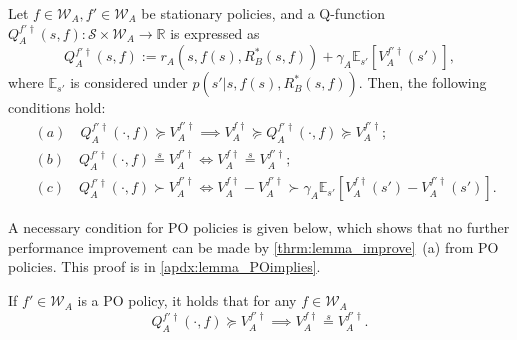 \documentclass{acml}
\providecommand{\R}{\mathbb{R}} %
\providecommand{\E}{\mathbb{E}} %
\providecommand{\x}{\times}
\providecommand{\eqs}{\stackrel{s}{=}}
\begin{document}
\begin{theorem}\label{thrm:lemma_improve}
	Let $f\in\mathcal{W}_A,f'\in\mathcal{W}_A$ be stationary policies, and a Q-function $Q_A^{f'\dag}(s,f): \mathcal{S}\x\mathcal{W}_A\to\R$ is expressed as
	\begin{equation*}
		Q_A^{f'\dag}(s,f):=r_A(s,f(s),R_B^*(s,f))+\gamma_A\E_{s'}\left[V_A^{f'\dag}(s')\right],%
	\end{equation*}
	where $\E_{s'}$ is considered under $p(s'|s,f(s),R_B^*(s,f))$. 
	Then, the following conditions hold:
        \begin{align*}
            &(a)\quad Q_A^{f'\dag}(\cdot ,f) \succcurlyeq V_A^{f'\dag}\implies V_A^{f\dag} \succcurlyeq Q_A^{f'\dag}(\cdot,f)\succcurlyeq V_A^{f'\dag};\\
            &(b)\quad Q_A^{f'\dag}(\cdot,f)\eqs V_A^{f'\dag} \iff V_A^{f\dag}\eqs V_A^{f'\dag};\\
            &(c)\quad Q_A^{f'\dag}(\cdot ,f) \succ V_A^{f'\dag} \iff V_A^{f\dag} - V_A^{f'\dag} \succ \gamma_A\E_{s'}\left[V_A^{f\dag}(s') - V_A^{f'\dag}(s')\right].
        \end{align*}
\end{theorem}

A necessary condition for PO policies is given below, which shows that no further performance improvement can be made by \cref{thrm:lemma_improve}~(a) from PO policies. 
This proof is in \cref{apdx:lemma_POimplies}.

\begin{theorem}\label{thrm:lemma_POimplies}
	If $f'\in \mathcal{W}_A$ is a PO policy, it holds that for any $f\in \mathcal{W}_A$
	\begin{equation}
		Q_A^{f'\dag}(\cdot,f)\succcurlyeq V_A^{f'\dag}
		\implies V_A^{f\dag}\eqs V_A^{f'\dag}.\label{eq:lemma_POimplies}
	\end{equation}
\end{theorem}
\end{document}
